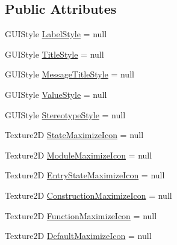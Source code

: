 \subsection*{Public Attributes}
\begin{DoxyCompactItemize}
\item 
G\+U\+I\+Style \hyperlink{classi_c_s___graphics_a694bf9ea3617ff4af68f040de77a8a98}{Label\+Style} = null
\item 
G\+U\+I\+Style \hyperlink{classi_c_s___graphics_aa469f9e3a6dc60b0b0045576a4d073db}{Title\+Style} = null
\item 
G\+U\+I\+Style \hyperlink{classi_c_s___graphics_a9de32afd9ed0d1bda56641d0cea8e095}{Message\+Title\+Style} = null
\item 
G\+U\+I\+Style \hyperlink{classi_c_s___graphics_a179b17c0a64bfca046b8d7f8e82cc3f0}{Value\+Style} = null
\item 
G\+U\+I\+Style \hyperlink{classi_c_s___graphics_acc14f405c69cf4a4fa4fd13274abb19b}{Stereotype\+Style} = null
\item 
Texture2\+D \hyperlink{classi_c_s___graphics_ae60d573201fa8574756940d6959da30b}{State\+Maximize\+Icon} = null
\item 
Texture2\+D \hyperlink{classi_c_s___graphics_aec14087e6b8553959172a6700c637e39}{Module\+Maximize\+Icon} = null
\item 
Texture2\+D \hyperlink{classi_c_s___graphics_a12b6a81bdfe049f423183110722c4f73}{Entry\+State\+Maximize\+Icon} = null
\item 
Texture2\+D \hyperlink{classi_c_s___graphics_ad96be9bcb78a8bdae14e6f3b4c9f6b0f}{Construction\+Maximize\+Icon} = null
\item 
Texture2\+D \hyperlink{classi_c_s___graphics_a55744c7b423a2ad4cf8940edd9d8f9fa}{Function\+Maximize\+Icon} = null
\item 
Texture2\+D \hyperlink{classi_c_s___graphics_a6c45a2ac7a92047f71e8c95d160f7fd7}{Default\+Maximize\+Icon} = null
\end{DoxyCompactItemize}
